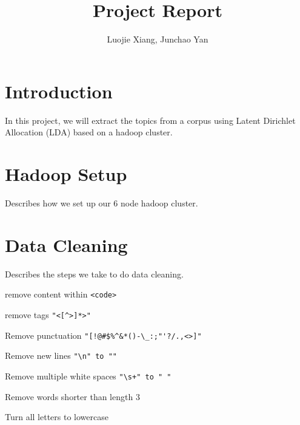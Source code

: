 \documentclass{article}
\begin{document}
\title{Project Report}
\author{Luojie Xiang, Junchao Yan}
\date{}
\maketitle

\section{Introduction}
In this project, we will extract the topics from a corpus using Latent Dirichlet Allocation (LDA) based on a hadoop cluster.  
\section{Hadoop Setup}

Describes how we set up our 6 node hadoop cluster.

\section{Data Cleaning}

Describes the steps we take to do data cleaning.

remove content within \verb+<code>+

remove tags \verb+"<[^>]*>"+

Remove punctuation \verb+"[!@#$%^&*()-\_:;"'?/.,<>]"+

Remove new lines \verb+"\n" to ""+

Remove multiple white spaces \verb-"\s+" to " "-

Remove words shorter than length 3

Turn all letters to lowercase
\end{document}
